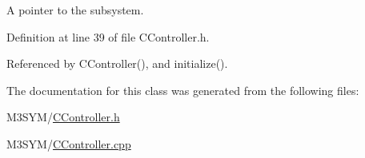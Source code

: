 A pointer to the subsystem. 



Definition at line 39 of file C\+Controller.\+h.



Referenced by C\+Controller(), and initialize().



The documentation for this class was generated from the following files\+:\begin{DoxyCompactItemize}
\item 
M3\+S\+Y\+M/\hyperlink{CController_8h}{C\+Controller.\+h}\item 
M3\+S\+Y\+M/\hyperlink{CController_8cpp}{C\+Controller.\+cpp}\end{DoxyCompactItemize}
